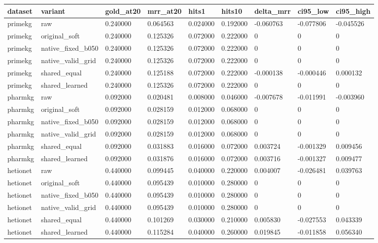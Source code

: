 \begin{tabular}{lllllllll}
\hline
dataset & variant & gold\_at20 & mrr\_at20 & hits1 & hits10 & delta\_mrr & ci95\_low & ci95\_high \\
\hline
primekg & raw & 0.240000 & 0.064563 & 0.024000 & 0.192000 & -0.060763 & -0.077806 & -0.045526 \\
primekg & original\_soft & 0.240000 & 0.125326 & 0.072000 & 0.222000 & 0 & 0 & 0 \\
primekg & native\_fixed\_b050 & 0.240000 & 0.125326 & 0.072000 & 0.222000 & 0 & 0 & 0 \\
primekg & native\_valid\_grid & 0.240000 & 0.125326 & 0.072000 & 0.222000 & 0 & 0 & 0 \\
primekg & shared\_equal & 0.240000 & 0.125188 & 0.072000 & 0.222000 & -0.000138 & -0.000446 & 0.000132 \\
primekg & shared\_learned & 0.240000 & 0.125326 & 0.072000 & 0.222000 & 0 & 0 & 0 \\
pharmkg & raw & 0.092000 & 0.020481 & 0.008000 & 0.046000 & -0.007678 & -0.011991 & -0.003960 \\
pharmkg & original\_soft & 0.092000 & 0.028159 & 0.012000 & 0.068000 & 0 & 0 & 0 \\
pharmkg & native\_fixed\_b050 & 0.092000 & 0.028159 & 0.012000 & 0.068000 & 0 & 0 & 0 \\
pharmkg & native\_valid\_grid & 0.092000 & 0.028159 & 0.012000 & 0.068000 & 0 & 0 & 0 \\
pharmkg & shared\_equal & 0.092000 & 0.031883 & 0.016000 & 0.072000 & 0.003724 & -0.001329 & 0.009456 \\
pharmkg & shared\_learned & 0.092000 & 0.031876 & 0.016000 & 0.072000 & 0.003716 & -0.001327 & 0.009477 \\
hetionet & raw & 0.440000 & 0.099445 & 0.040000 & 0.220000 & 0.004007 & -0.026481 & 0.039763 \\
hetionet & original\_soft & 0.440000 & 0.095439 & 0.010000 & 0.280000 & 0 & 0 & 0 \\
hetionet & native\_fixed\_b050 & 0.440000 & 0.095439 & 0.010000 & 0.280000 & 0 & 0 & 0 \\
hetionet & native\_valid\_grid & 0.440000 & 0.095439 & 0.010000 & 0.280000 & 0 & 0 & 0 \\
hetionet & shared\_equal & 0.440000 & 0.101269 & 0.030000 & 0.210000 & 0.005830 & -0.027553 & 0.043339 \\
hetionet & shared\_learned & 0.440000 & 0.115284 & 0.040000 & 0.260000 & 0.019845 & -0.011858 & 0.056340 \\

\end{tabular}
